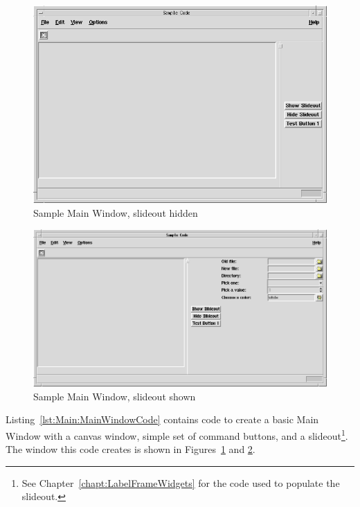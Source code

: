 
\begin{figure}[hbpt]
\begin{centering}
\includegraphics[width=5in]{MainWindow1.png}
\caption{Sample Main Window, slideout hidden}
\label{fig:Main:MainWindow1}
\end{centering}
\end{figure}
\begin{figure}[hbpt]
\begin{centering}
\includegraphics[width=5in]{MainWindow2.png}
\caption{Sample Main Window, slideout shown}
\label{fig:Main:MainWindow2}
\end{centering}
\end{figure}
Listing~\ref{lst:Main:MainWindowCode} contains code to create a basic
Main Window with a canvas window, simple set of command buttons, and a
slideout\footnote{See Chapter~\ref{chapt:LabelFrameWidgets} for the code used
to populate the slideout.}.  The window this code creates is shown in
Figures~\ref{fig:Main:MainWindow1} and \ref{fig:Main:MainWindow2}.
